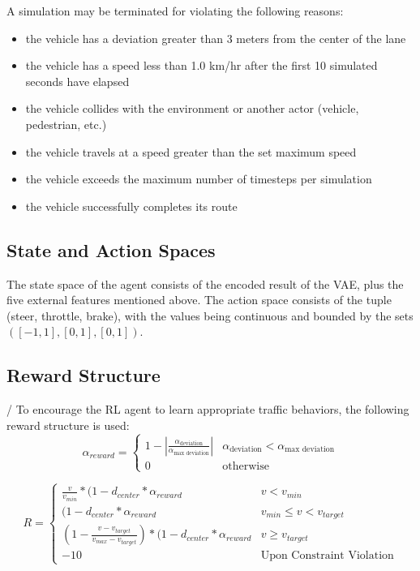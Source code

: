 \documentclass[12pt,oneside,letterpaper]{article}
\begin{document}
A simulation may be terminated for violating the following reasons: \\
\begin{itemize}
\item the vehicle has a deviation greater than 3 meters from the center of the lane
\item the vehicle has a speed less than 1.0 km/hr after the first 10 simulated seconds have elapsed
\item the vehicle collides with the environment or another actor (vehicle, pedestrian, etc.)
\item the vehicle travels at a speed greater than the set maximum speed
\item the vehicle exceeds the maximum number of timesteps per simulation
\item the vehicle successfully completes its route
\end{itemize}

\subsection{State and Action Spaces}
The state space of the agent consists of the encoded result of the VAE, plus the five external features mentioned above. The action space consists of the tuple (steer, throttle, brake), with the values being continuous and bounded by the sets $\left([-1,1],[0,1],[0,1]\right)$.

\subsection{Reward Structure} /
To encourage the RL agent to learn appropriate traffic behaviors, the following reward structure is used:
\[ \alpha_{reward}= \begin{cases}
1- | \frac{\alpha_{\text{deviation}}}{\alpha_{\text{max deviation}}} | & \alpha_{\text{deviation}} < \alpha_{\text{max deviation}} \\
0 & \text{otherwise}
\end{cases}
\]

\[ R = \begin{cases}
\frac{v}{v_{min}} * (1- d_{center} * \alpha_{reward}  & v < v_{min} \\
(1- d_{center} * \alpha_{reward}  & v_{min} \leq v <v_{target} \\
\left(1 - \frac{v - v_{target}}{v_{max} - v_{target}} \right) * (1- d_{center} * \alpha_{reward} & v \geq v_{target} \\
-10 & \text{Upon Constraint Violation}
\end{cases}
\]

\end{document}
